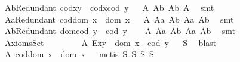 \begin{isabellebody}
\ A{}bRedundant{\isacharcolon}\ {\isachardoublequoteopen}cod{\isacharparenleft}x{\isasymcdot}y{\isacharparenright}\ {\isasymcong}\ cod{\isacharparenleft}x{\isasymcdot}{\isacharparenleft}cod\ y{\isacharparenright}{\isacharparenright}{\isachardoublequoteclose}%
\isadelimproof
\ %
\endisadelimproof
%
\isatagproof
{}\isamarkupfalse%
\ A{}\ A{}b\ A{}b\ A{}\ \isamarkupfalse%
\ smt%
\endisatagproof
{\isafoldproof}%
%
\isadelimproof
%
\endisadelimproof
\isanewline
\ \ \ \isamarkupfalse%
\ A{}aRedundant{\isacharcolon}\ {\isachardoublequoteopen}cod{\isacharparenleft}dom\ x{\isacharparenright}\ {\isasymcong}\ dom\ x{\isachardoublequoteclose}%
\isadelimproof
\ %
\endisadelimproof
%
\isatagproof
{}\isamarkupfalse%
\ A{}\ A{}a\ A{}b\ A{}a\ A{}b\ \isamarkupfalse%
\ smt%
\endisatagproof
{\isafoldproof}%
%
\isadelimproof
%
\endisadelimproof
\isanewline
\ \ \ \isamarkupfalse%
\ A{}bRedundant{\isacharcolon}\ {\isachardoublequoteopen}dom{\isacharparenleft}cod\ y{\isacharparenright}\ {\isasymcong}\ cod\ y{\isachardoublequoteclose}%
\isadelimproof
\ %
\endisadelimproof
%
\isatagproof
{}\isamarkupfalse%
\ \ A{}\ A{}a\ A{}b\ A{}a\ A{}b\ \isamarkupfalse%
\ smt%
\endisatagproof
{\isafoldproof}%
%
\isadelimproof
%
\endisadelimproof
\ \isanewline
\ \ \isamarkupfalse%
%
\isamarkuptrue%
\ \isamarkupfalse%
\ AxiomsSet{}\isanewline
\ \ \ \isanewline
\ \ \ \isamarkupfalse%
\ A{}{\isacharcolon}\ {\isachardoublequoteopen}E{\isacharparenleft}x{\isasymcdot}y{\isacharparenright}\ \isactrlbold {\isasymleftrightarrow}\ dom\ x\ {\isasymsimeq}\ cod\ y{\isachardoublequoteclose}%
\isadelimproof
\ %
\endisadelimproof
%
\isatagproof
{}\isamarkupfalse%
\ S{}\ \isamarkupfalse%
\ blast%
\endisatagproof
{\isafoldproof}%
%
\isadelimproof
%
\endisadelimproof
\isanewline
\ \ \ \isamarkupfalse%
\ A{}{\isacharcolon}\ {\isachardoublequoteopen}cod{\isacharparenleft}dom\ x{\isacharparenright}\ {\isasymcong}\ dom\ x{\isachardoublequoteclose}%
\isadelimproof
\ %
\endisadelimproof
%
\isatagproof
{}\isamarkupfalse%
\ {\isacharparenleft}metis\ S{}\ S{}\ S{}\ S{}{\isacharparenright}%

\end{isabellebody}
